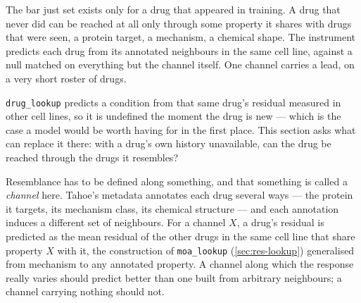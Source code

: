 \clearpage

\begin{question}[8]
The bar just set exists only for a drug that appeared in training. A drug that
never did can be reached at all only through some property it shares with drugs
that were seen, a protein target, a mechanism, a chemical shape. The instrument
predicts each drug from its annotated neighbours in the same cell line, against a
null matched on everything but the channel itself. One channel carries a lead, on
a very short roster of drugs.
\end{question}

\noindent
\texttt{drug\_lookup} predicts a condition from that same drug's residual
measured in other cell lines, so it is undefined the moment the drug is new ---
which is the case a model would be worth having for in the first place. This
section asks what can replace it there: with a drug's own history unavailable, can
the drug be reached through the drugs it resembles?

Resemblance has to be defined along something, and that something is called a
\emph{channel} here. Tahoe's metadata annotates each drug several ways --- the
protein it targets, its mechanism class, its chemical structure --- and each
annotation induces a different set of neighbours. For a channel $X$, a drug's
residual is predicted as the mean residual of the other drugs in the same cell
line that share property $X$ with it, the construction of \texttt{moa\_lookup}
(\cref{sec:res-lookup}) generalised from mechanism to any annotated property. A
channel along which the response really varies should predict better than one
built from arbitrary neighbours; a channel carrying nothing should not.

